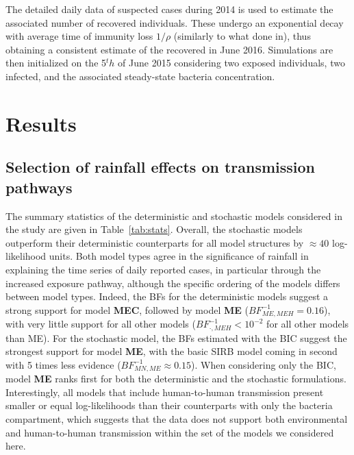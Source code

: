  The detailed daily data of suspected cases during 2014 is used to estimate the associated number of recovered individuals. These undergo an exponential decay with average time of immunity loss $1/\rho$ (similarly to what done in\cite{Pasetto:RealtimeProjectionsCholera:2017}), thus obtaining a consistent estimate of the recovered in June 2016. Simulations are then initialized on the 5$^th$ of June 2015 considering two exposed individuals, two infected, and the associated steady-state bacteria concentration. 
 
\section{Results}

\subsection{Selection of rainfall effects on transmission pathways}
The summary statistics of the deterministic and stochastic models considered in the study are given in Table~\ref{tab:stats}. Overall, the stochastic models outperform their deterministic counterparts for all model structures by $\approx 40$ log-likelihood units. Both model types agree in the significance of rainfall in explaining the time series of daily reported cases, in particular through the increased exposure pathway, although the specific ordering of the models differs between model types. Indeed, the BFs for the deterministic models suggest a strong support for model \textbf{MEC}, followed by model \textbf{ME} ($BF^{-1}_{ME,MEH} = 0.16$), with very little support for all other models ($BF^{-1}_{\boldsymbol{\cdot},MEH}< 10^{-2}$ for all other models than ME). For the stochastic model, the BFs estimated with the BIC suggest the strongest support for model \textbf{ME}, with the basic SIRB model coming in second with 5 times less evidence ($BF^{-1}_{MN,ME} \approx 0.15$). When considering only the BIC, model \textbf{ME} ranks first for both the deterministic and the stochastic formulations. Interestingly, all models that include human-to-human transmission present smaller or equal log-likelihoods than their counterparts with only the bacteria compartment, which suggests that the data does not support both environmental and human-to-human transmission within the set of the models we considered here.

